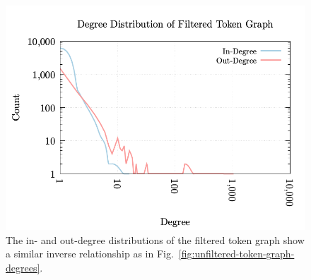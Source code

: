 \begin{figure}
  \centerline{\includegraphics[width=\columnwidth]{img/degree-distributions/filtered-token-graph-degrees.png}}
  \caption{The in- and out-degree distributions of the filtered token
    graph show a similar inverse relationship as in
    Fig.~\ref{fig:unfiltered-token-graph-degrees}.}\label{fig:filtered-token-graph-degrees}
\end{figure}


